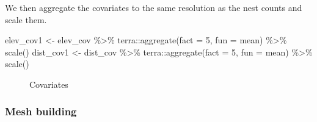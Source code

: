 \documentclass[
  letterpaper,
  DIV=11,
  numbers=noendperiod]{scrartcl}
\newenvironment{Shaded}{\begin{snugshade}}{\end{snugshade}}
\newcommand{\AttributeTok}[1]{\textcolor[rgb]{0.40,0.45,0.13}{#1}}
\newcommand{\DecValTok}[1]{\textcolor[rgb]{0.68,0.00,0.00}{#1}}
\newcommand{\FunctionTok}[1]{\textcolor[rgb]{0.28,0.35,0.67}{#1}}
\newcommand{\NormalTok}[1]{\textcolor[rgb]{0.00,0.23,0.31}{#1}}
\newcommand{\OtherTok}[1]{\textcolor[rgb]{0.00,0.23,0.31}{#1}}
\newcommand{\SpecialCharTok}[1]{\textcolor[rgb]{0.37,0.37,0.37}{#1}}
\begin{document}
We then aggregate the covariates to the same resolution as the nest
counts and scale them.

\begin{Shaded}
\begin{Highlighting}[]
\NormalTok{elev\_cov1 }\OtherTok{\textless{}{-}}\NormalTok{ elev\_cov }\SpecialCharTok{\%\textgreater{}\%} 
\NormalTok{  terra}\SpecialCharTok{::}\FunctionTok{aggregate}\NormalTok{(}\AttributeTok{fact =} \DecValTok{5}\NormalTok{, }\AttributeTok{fun =}\NormalTok{ mean) }\SpecialCharTok{\%\textgreater{}\%} \FunctionTok{scale}\NormalTok{()}
\NormalTok{dist\_cov1 }\OtherTok{\textless{}{-}}\NormalTok{ dist\_cov }\SpecialCharTok{\%\textgreater{}\%} 
\NormalTok{  terra}\SpecialCharTok{::}\FunctionTok{aggregate}\NormalTok{(}\AttributeTok{fact =} \DecValTok{5}\NormalTok{, }\AttributeTok{fun =}\NormalTok{ mean) }\SpecialCharTok{\%\textgreater{}\%} \FunctionTok{scale}\NormalTok{()}
\end{Highlighting}
\end{Shaded}

\begin{figure}


\caption{\label{fig-covariate-raster}Covariates}

\end{figure}%

\subsubsection{Mesh building}\label{mesh-building}
\end{document}
